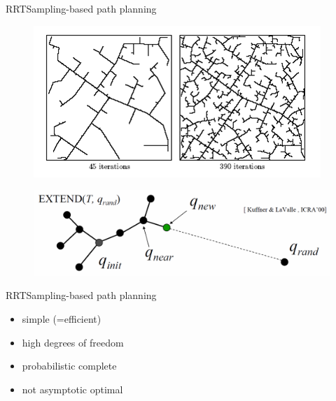 \begin{frame}{RRT}{Sampling-based path planning}
	\begin{figure}
		\centering
		\includegraphics[width=.5\linewidth]{figure/RRT_graph1}
		\label{fig:rrt}
	\end{figure}
	\begin{figure}
		\centering
		\includegraphics[width=.9\linewidth]{figure/rrt_extend}
		\label{fig:rrt_extend}
	\end{figure}
\end{frame}

\begin{frame}{RRT}{Sampling-based path planning}
	\begin{itemize}
	    \item simple (=efficient)
	    \item high degrees of freedom
		\item probabilistic complete 
		\item not asymptotic optimal
	\end{itemize}
\end{frame}


